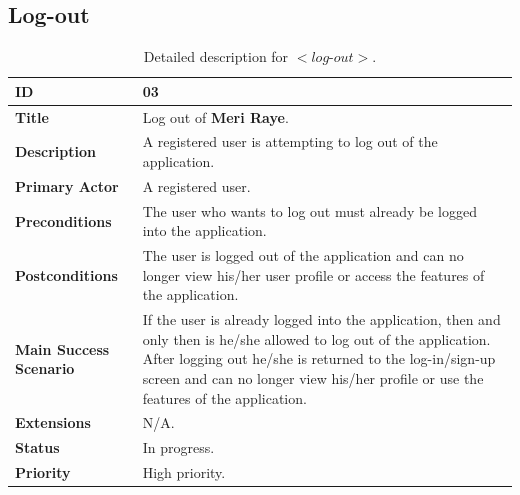 \documentclass[11pt]{extarticle}
\begin{document}
\subsection{Log-out}
\begin{table}[H]
    \begin{center}
        \begin{tabular}{ |m{6cm}|p{6cm}| } 
           \hline
           \textbf{ID} & 03\\
           \hline
           \textbf{Title} & Log out of \textbf{Meri Raye}.\\
           \hline
           \textbf{Description} & A registered user is attempting to log out of the application.\\
           \hline
           \textbf{Primary Actor} & A registered user.\\
           \hline
           \textbf{Preconditions} & The user who wants to log out must already be logged into the application.\\
           \hline
           \textbf{Postconditions} & The user is logged out of the application and can no longer view his/her user profile or access the features of the application.\\
           \hline
           \textbf{Main Success Scenario} & If the user is already logged into the application, then and only then is he/she allowed to log out of the application. After logging out he/she is returned to the log-in/sign-up screen and can no longer view his/her profile or use the features of the application.\\
           \hline
           \textbf{Extensions} & N/A.\\
           \hline
           \textbf{Status} & In progress.\\
           \hline
           \textbf{Priority} & High priority.\\
           \hline
        \end{tabular}
    \end{center}
    \caption{\label{tab:Table 3} Detailed description for $<\textit{log-out}>$.}
\end{table}

\newpage
\end{document}
